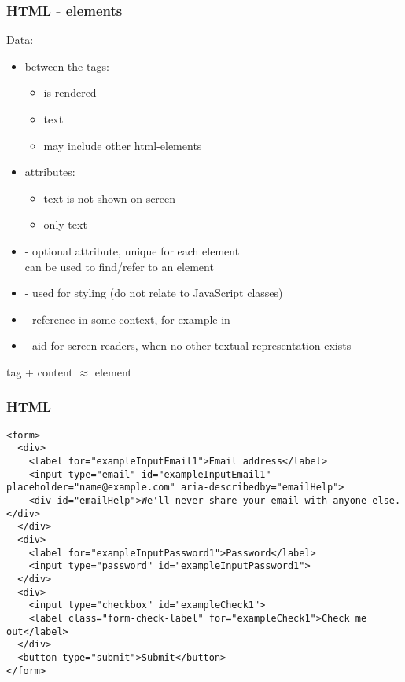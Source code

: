 \begin{frame}[fragile]
\frametitle{HTML - elements}
\color{structure}
Data:
\begin{itemize}\color{structure}
\item between the tags: 
  \begin{itemize}\color{structure}
  \item is rendered
  \item text 
  \item may include other html-elements 
  \end{itemize}
\end{itemize}

\begin{itemize}\color{structure}
\item attributes:  
  \begin{itemize}\color{structure}
    \item text is not shown on screen
    \item only text
  \end{itemize}
  \item {} - optional attribute, unique for each element\\ can be used to find/refer to an element
  \item {} - used for styling (do not relate to JavaScript classes)
  \item {} - reference in some context, for example in 
  \item {} - aid for screen readers, when no other textual representation exists
\end{itemize}
\bigskip
tag + content $\approx$ element
\end{frame}

\begin{frame}[fragile]
\frametitle{HTML}
\begin{lstlisting}[style=htmlcssjs]
<form>
  <div>
    <label for="exampleInputEmail1">Email address</label>
    <input type="email" id="exampleInputEmail1" placeholder="name@example.com" aria-describedby="emailHelp">
    <div id="emailHelp">We'll never share your email with anyone else.</div>
  </div>
  <div>
    <label for="exampleInputPassword1">Password</label>
    <input type="password" id="exampleInputPassword1">
  </div>
  <div>
    <input type="checkbox" id="exampleCheck1">
    <label class="form-check-label" for="exampleCheck1">Check me out</label>
  </div>
  <button type="submit">Submit</button>
</form>
\end{lstlisting}
\end{frame}

